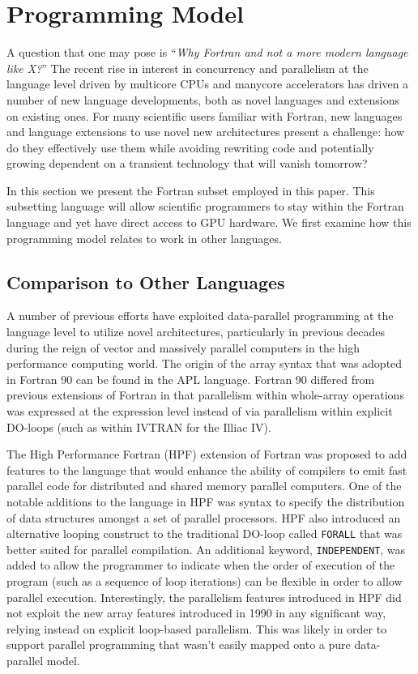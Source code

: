 \section{Programming Model}

A question that one may pose is ``\emph{Why Fortran and not a more modern
  language like X?}''  The recent rise in interest in concurrency and
parallelism at the language level driven by multicore CPUs and manycore
accelerators has driven a number of new language developments, both as novel
languages and extensions on existing ones.  For many scientific users familiar
with Fortran, new languages and language extensions to use novel new
architectures present a challenge: how do they effectively use them while
avoiding rewriting code and potentially growing dependent on a transient
technology that will vanish tomorrow?

In this section we present the Fortran subset employed in this paper.  This
subsetting language will allow scientific programmers to stay within the Fortran
language and yet have direct access to GPU hardware.  We first examine how this
programming model relates to work in other languages.


\subsection{Comparison to Other Languages}

A number of previous efforts have exploited data-parallel programming
at the language level to utilize novel architectures, particularly in
previous decades during the reign of vector and massively parallel
computers in the high performance computing world.  The origin of the
array syntax that was adopted in Fortran 90 can be found in the APL
language.  Fortran 90 differed from previous %
extensions of Fortran in that parallelism within whole-array
operations was expressed at the expression level instead of via
parallelism within explicit DO-loops (such as within IVTRAN for the
Illiac IV).

The High Performance Fortran (HPF) extension of Fortran was
proposed to add features to the language that would enhance the
ability of compilers to emit fast parallel code for distributed and
shared memory parallel computers\cite{koelbel94hpf}.  One of the
notable additions to the language in HPF was syntax to specify the
distribution of data structures amongst a set of parallel processors.
HPF also introduced an alternative looping construct to the
traditional DO-loop called {\tt FORALL} that was better suited for
parallel compilation.  An additional keyword, {\tt INDEPENDENT}, was
added to allow the programmer to indicate when the order of execution
of the program (such as a sequence of loop iterations) can be flexible
in order to allow parallel execution.  Interestingly, the parallelism
features introduced in HPF did not exploit the new array features
introduced in 1990 in any significant way, relying instead on explicit
loop-based parallelism.  This was likely in order to support parallel
programming that wasn't easily mapped onto a pure data-parallel model.

